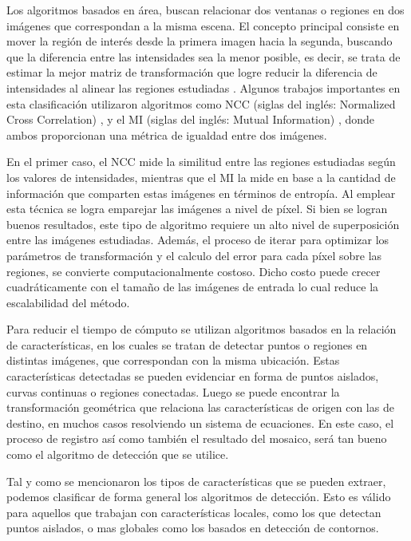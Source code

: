 
Los algoritmos basados en área, buscan relacionar dos ventanas o regiones en dos imágenes que correspondan a la misma escena. El concepto principal consiste en mover la región de interés desde la primera imagen hacia la segunda, buscando que la diferencia entre las intensidades sea la menor posible, es decir,  se trata de estimar la mejor matriz de transformación que logre reducir la diferencia de intensidades al alinear las regiones estudiadas \cite{nccvsmi}. Algunos trabajos importantes en esta clasificación utilizaron algoritmos como NCC (siglas del inglés: Normalized Cross Correlation) \cite{ncc}, y el MI (siglas del inglés: Mutual Information) \cite{mi}, donde ambos proporcionan una métrica de igualdad entre dos imágenes.

En el primer caso, el NCC mide la similitud entre las regiones estudiadas según los valores de intensidades, mientras que el MI la mide en base a la cantidad de información que comparten estas imágenes en términos de entropía. Al emplear esta técnica se logra emparejar las imágenes a nivel de píxel. Si bien se logran buenos resultados, este tipo de algoritmo requiere un alto nivel de superposición entre las imágenes estudiadas. Además, el proceso de iterar para optimizar los parámetros de transformación y el calculo del error para cada píxel sobre las regiones, se convierte computacionalmente costoso. Dicho costo puede crecer cuadráticamente con el tamaño de las imágenes de entrada lo cual reduce la escalabilidad del método.



Para reducir el tiempo de cómputo se utilizan algoritmos basados en la relación de características, en los cuales se tratan de detectar puntos o regiones en distintas imágenes, que correspondan con la misma ubicación. Estas características detectadas se pueden evidenciar en forma de puntos aislados, curvas continuas o regiones conectadas. Luego se puede encontrar la transformación geométrica que relaciona las características de origen con las de destino, en muchos casos resolviendo un sistema de ecuaciones. En este caso, el proceso de registro así como también el resultado del mosaico, será tan bueno como el algoritmo de detección que se utilice.

Tal y como se mencionaron los tipos de características que se pueden extraer, podemos clasificar de forma general los algoritmos de detección. Esto es válido para aquellos que trabajan con características locales, como los que detectan puntos aislados, o mas globales como los basados en detección de contornos.

